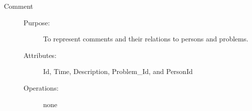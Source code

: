 \begin{description}
\item[Comment]\hfill
\begin{description}
	\item[Purpose:]To represent comments and their relations to persons and problems.
	\item[Attributes:]Id, Time, Description, Problem\_Id, and PersonId
	\item[Operations:]none
\end{description}
\end{description}
